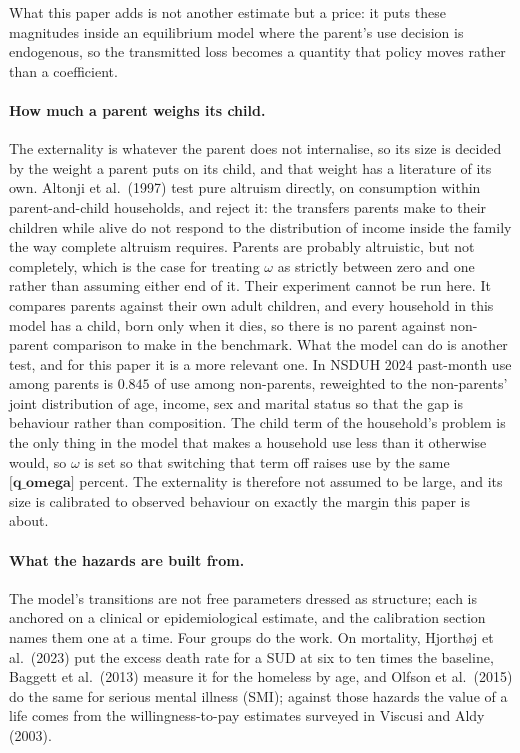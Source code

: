 \documentclass[10pt]{article}
\begin{document}
What this paper adds is not another estimate but a price:
it puts these magnitudes inside an equilibrium model where the parent's use decision
is endogenous, so the transmitted loss becomes a quantity that policy moves rather
than a coefficient.



\paragraph{How much a parent weighs its child.} The externality is
whatever the parent does not internalise, so its size is decided by the weight a
parent puts on its child, and that weight has a literature of its own. Altonji et
al.\ (1997) test pure altruism directly, on consumption within parent-and-child
households, and reject it: the transfers parents make to their children while
alive do not respond to the distribution of income inside the family the way
complete altruism requires. Parents are probably altruistic, but not
completely, which is the case for treating $\omega$ as strictly between zero and one
rather than assuming either end of it. Their experiment cannot be run here. It compares parents against their
own adult children, and every household in this model has a child, born only when it
dies, so there is no parent against non-parent comparison to make in the benchmark.
What the model can do is another test, and for this paper
it is a more relevant one. In NSDUH 2024 past-month use among parents is $0.845$ of use among non-parents, reweighted to the non-parents' joint distribution of age, income, sex and marital status so that the gap
is behaviour rather than composition. The child term of the household's problem is
the only thing in the model that makes a household use less than it otherwise would,
so $\omega$ is set so that switching that term off raises use by the same $\textbf{[q_omega]}$
percent. The externality is therefore not assumed to be large, and its size is
calibrated to observed behaviour on exactly the margin this paper is about.

\paragraph{What the hazards are built from.} The model's transitions are not
free parameters dressed as structure; each is anchored on a clinical or
epidemiological estimate, and the calibration section names them one at a time. Four
groups do the work. On mortality, Hjorth\o j et al.\ (2023) put the excess death
rate for a SUD at six to ten times the baseline, Baggett et al.\
(2013) measure it for the homeless by age, and Olfson et al.\ (2015) do the same for
serious mental illness (SMI); against those hazards the value of a life comes from the
willingness-to-pay estimates surveyed in Viscusi and Aldy (2003).
\end{document}
